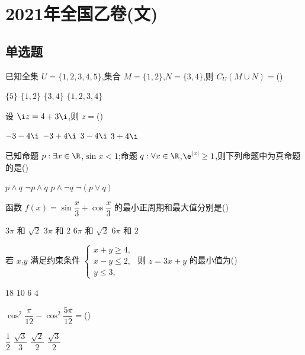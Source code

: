 \chapter{2021年全国乙卷(文)}

\section{单选题}

\begin{problem}
已知全集 \(U=\{1,2,3,4,5\}\),集合 \(M=\{1,2\}\),\(N=\{3,4\}\),则 \(C_U\left(M\cup N\right)=\)(\quad)

\choices
    {\(\{5\}\)}
    {\(\{1,2\}\)}
    {\(\{3,4\}\)}
    {\(\{1,2,3,4\}\)}
\end{problem}

\begin{problem}
设 \(\i z=4+3\i\),则 \(z=\)(\quad)

\choices
    {\(-3-4\i\)}
    {\(-3+4\i\)}
    {\(3-4\i\)}
    {\(3+4\i\)}
\end{problem}

\begin{problem}
已知命题 \(p:\exists x\in\R\),\(\sin x<1\);命题 \(q:\forall x\in\R\),\(\e^{|x|}\ge1\),则下列命题中为真命题的是(\quad)

\choices
    {\(p\wedge q\)}
    {\(\neg p\wedge q\)}
    {\(p\wedge \neg q\)}
    {\(\neg\left(p\vee q\right)\)}
\end{problem}

\begin{problem}
函数 \(f(x)=\sin\dfrac{x}{3}+\cos\dfrac{x}{3}\) 的最小正周期和最大值分别是(\quad)

\choices
    {\(3\pi\) 和 \(\sqrt2\)}
    {\(3\pi\) 和 \(2\)}
    {\(6\pi\) 和 \(\sqrt2\)}
    {\(6\pi\) 和 \(2\)}
\end{problem}

\begin{problem}
若 \(x\),\(y\) 满足约束条件
\(\begin{cases}
x+y\ge4,\\
x-y\le2,\\
y\le3,
\end{cases}\)
则 \(z=3x+y\) 的最小值为(\quad)

\choices
    {\(18\)}
    {\(10\)}
    {\(6\)}
    {\(4\)}
\end{problem}

\begin{problem}
\(\cos^2\dfrac{\pi}{12}-\cos^2\dfrac{5\pi}{12}=\)(\quad)

\choices
    {\(\dfrac{1}{2}\)}
    {\(\dfrac{\sqrt3}{3}\)}
    {\(\dfrac{\sqrt2}{2}\)}
    {\(\dfrac{\sqrt3}{2}\)}
\end{problem}

